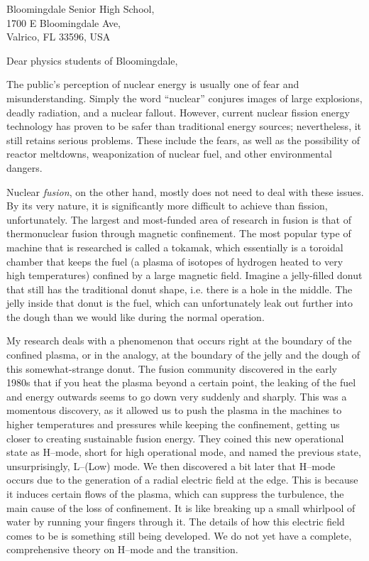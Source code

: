 \documentclass[12pt,a4paper]{letter}
\date{\today}
\begin{document}
\begin{letter}{
	Bloomingdale Senior High School,\\
	1700 E Bloomingdale Ave,\\
	Valrico, FL 33596, USA
}

\opening{Dear physics students of Bloomingdale,}


The public's perception of nuclear energy is usually one of fear and misunderstanding.
Simply the word ``nuclear'' conjures images of large explosions, deadly radiation, and a nuclear fallout.
However, current nuclear fission energy technology has proven to be safer than traditional energy sources; nevertheless, it still retains serious problems.
These include the fears, as well as the possibility of reactor meltdowns, weaponization of nuclear fuel, and other environmental dangers. 

Nuclear \emph{fusion}, on the other hand, mostly does not need to deal with these issues.
By its very nature, it is significantly more difficult to achieve than fission, unfortunately.
The largest and most-funded area of research in fusion is that of thermonuclear fusion through magnetic confinement.
The most popular type of machine that is researched is called a tokamak, which essentially is a toroidal chamber that keeps the fuel (a plasma of isotopes of hydrogen heated to very high temperatures) confined by a large magnetic field.
Imagine a jelly-filled donut that still has the traditional donut shape, i.e. there is a hole in the middle.
The jelly inside that donut is the fuel, which can unfortunately leak out further into the dough than we would like during the normal operation.

My research deals with a phenomenon that occurs right at the boundary of the confined plasma, or in the analogy, at the boundary of the jelly and the dough of this somewhat-strange donut.
The fusion community discovered in the early 1980s that if you heat the plasma beyond a certain point, the leaking of the fuel and energy outwards seems to go down very suddenly and sharply.
This was a momentous discovery, as it allowed us to push the plasma in the machines to higher temperatures and pressures while keeping the confinement, getting us closer to creating sustainable fusion energy.
They coined this new operational state as H--mode, short for high operational mode, and named the previous state, unsurprisingly, L--(Low) mode.
We then discovered a bit later that H--mode occurs due to the generation of a radial electric field at the edge.
This is because it induces certain flows of the plasma, which can suppress the turbulence, the main cause of the loss of confinement.
It is like breaking up a small whirlpool of water by running your fingers through it.
The details of how this electric field comes to be is something still being developed.
We do not yet have a complete, comprehensive theory on H--mode and the transition.


\end{letter}
\end{document}
